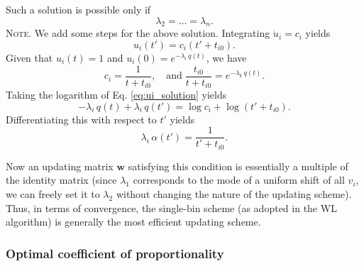 \documentclass[reprint]{revtex4-1}
\newcommand{\note}[1]{{\color{DarkGreen}\footnotesize \textsc{Note.} #1}}
\begin{document}
Such a solution is possible only if
\begin{equation}
\lambda_2 = \dots = \lambda_n.
\end{equation}
%
\note{
  We add some steps for the above solution.
  Integrating $\dot u_i = c_i$ yields
  \begin{equation}
  u_i(t') = c_i \left(t' + t_{i0} \right).
  \label{eq:ui_solution}
  \end{equation}
  Given that $u_i(t) = 1$ and $u_i(0) = e^{-\lambda_i \, q(t)}$,
  we have
  $$
  c_i = \frac{ 1 }{ t + t_{i0} },
  \quad
  \mathrm{and\;}
  \frac{ t_{i0} } { t + t_{i0} }
  =
  e^{ -\lambda_k \, q(t) }.
  $$
  Taking the logarithm of Eq. \eqref{eq:ui_solution} yields
  $$
  -\lambda_i \, q(t) + \lambda_i \, q(t')
  = \log c_i + \log\left( t' + t_{i0} \right).
  $$
  Differentiating this with respect to $t'$ yields
  $$
  \lambda_i \, \alpha(t') = \frac{ 1 } { t' + t_{i0} }.
  $$
}

Now an updating matrix $\mathbf w$ satisfying this condition
is essentially a multiple of the identity matrix
(since $\lambda_1$ corresponds to the mode
of a uniform shift of all $v_i$,
we can freely set it to $\lambda_2$
without changing the nature of the updating scheme).
%
Thus, in terms of convergence,
the single-bin scheme
(as adopted in the WL algorithm)
is generally the most efficient
updating scheme.




\subsubsection{Optimal coefficient of proportionality}
\end{document}
